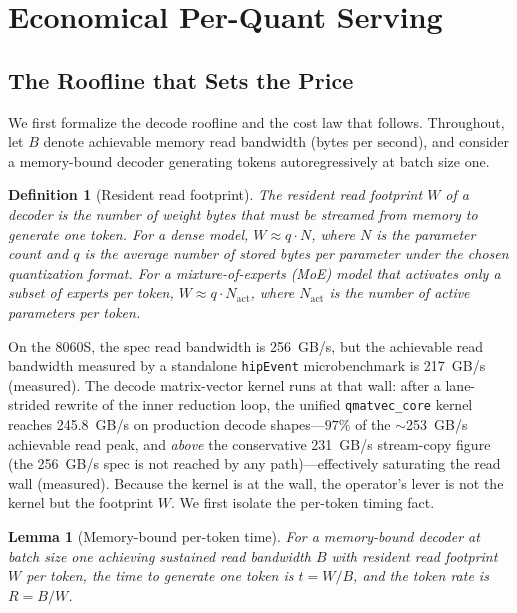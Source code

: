 \documentclass[11pt]{article}
\newtheorem{lemma}{Lemma}
\newtheorem{definition}{Definition}
\begin{document}
\section{Economical Per-Quant Serving}
\label{sec:serving}

\subsection{The Roofline that Sets the Price}

We first formalize the decode roofline and the cost law that follows. Throughout, let $B$ denote achievable memory read bandwidth (bytes per second), and consider a memory-bound decoder generating tokens autoregressively at batch size one.

\begin{definition}[Resident read footprint]
\label{def:footprint}
The \emph{resident read footprint} $W$ of a decoder is the number of weight bytes that must be streamed from memory to generate one token. For a dense model, $W \approx q \cdot N$, where $N$ is the parameter count and $q$ is the average number of stored bytes per parameter under the chosen quantization format. For a mixture-of-experts (MoE) model that activates only a subset of experts per token, $W \approx q \cdot N_{\mathrm{act}}$, where $N_{\mathrm{act}}$ is the number of \emph{active} parameters per token.
\end{definition}

On the 8060S, the spec read bandwidth is 256~GB/s, but the achievable read bandwidth measured by a standalone \texttt{hipEvent} microbenchmark is 217~GB/s (measured). The decode matrix-vector kernel runs at that wall: after a lane-strided rewrite of the inner reduction loop, the unified \texttt{qmatvec\_core} kernel reaches 245.8~GB/s on production decode shapes---$97\%$ of the $\sim$253~GB/s achievable read peak, and \emph{above} the conservative 231~GB/s stream-copy figure (the 256~GB/s spec is not reached by any path)---effectively saturating the read wall (measured). Because the kernel is at the wall, the operator's lever is not the kernel but the footprint $W$. We first isolate the per-token timing fact.

\begin{lemma}[Memory-bound per-token time]
\label{lem:pertoken}
For a memory-bound decoder at batch size one achieving sustained read bandwidth $B$ with resident read footprint $W$ per token, the time to generate one token is $t = W/B$, and the token rate is $R = B/W$.
\end{lemma}
\end{document}
